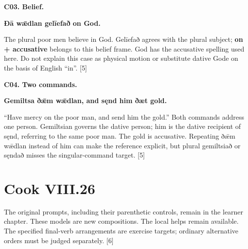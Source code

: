 \par\begin{minipage}{\linewidth}\raggedright
\textbf{C03. Belief.}

\textbf{Ðā wǣdlan gelīefað on God.}

The plural poor men believe in God. Gelīefað agrees with the plural subject; \textbf{on + accusative} belongs to this belief frame. God has the accusative spelling used here. Do not explain this case as physical motion or substitute dative Gode on the basis of English “in”. [5]

\end{minipage}\par\addvspace{4pt}

\par\begin{minipage}{\linewidth}\raggedright
\textbf{C04. Two commands.}

\textbf{Gemiltsa ðǣm wǣdlan, and sęnd him ðæt gold.}

“Have mercy on the poor man, and send him the gold.” Both commands address one person. Gemiltsian governs the dative person; him is the dative recipient of sęnd, referring to the same poor man. The gold is accusative. Repeating ðǣm wǣdlan instead of him can make the reference explicit, but plural gemiltsiað or sęndað misses the singular-command target. [5]

\end{minipage}\par\addvspace{4pt}

\section*{Cook VIII.26}

The original prompts, including their parenthetic controls, remain in the learner chapter. These models are new compositions. The local helps remain available. The specified final-verb arrangements are exercise targets; ordinary alternative orders must be judged separately. [6]

